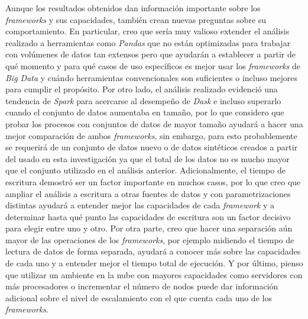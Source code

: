 Aunque los resultados obtenidos dan información importante sobre los \textit{frameworks} y sus capacidades, también crean nuevas preguntas sobre su comportamiento. En particular, creo que sería muy valioso extender el análisis realizado a herramientas como \textit{Pandas} que no están optimizadas para trabajar con volúmenes de datos tan extensos pero que ayudarán a establecer a partir de qué momento y para qué casos de uso específicos es mejor usar los \textit{frameworks} de \textit{Big Data} y cuándo herramientas convencionales son suficientes o incluso mejores para cumplir el propósito. Por otro lado, el análisis realizado evidenció una tendencia de \textit{Spark} para acercarse al desempeño de \textit{Dask} e incluso superarlo cuando el conjunto de datos aumentaba en tamaño, por lo que considero que probar los procesos con conjuntos de datos de mayor tamaño ayudará a hacer una mejor comparación de ambos \textit{frameworks}, sin embargo, para esto probablemente se requerirá de un conjunto de datos nuevo o de datos sintéticos creados a partir del usado en esta investigación ya que el total de los datos no es mucho mayor que el conjunto utilizado en el análisis anterior. Adicionalmente, el tiempo de escritura demostró ser un factor importante en muchos casos, por lo que creo que ampliar el análisis a escritura a otras fuentes de datos y con parametrizaciones distintas ayudará a entender mejor las capacidades de cada \textit{framework} y a determinar hasta qué punto las capacidades de escritura son un factor decisivo para elegir entre uno y otro. Por otra parte, creo que hacer una separación aún mayor de las operaciones de los \textit{frameworks}, por ejemplo midiendo el tiempo de lectura de datos de forma separada, ayudará a conocer más sobre las capacidades de cada uno y a entender mejor el tiempo total de ejecución. Y por último, pienso que utilizar un ambiente en la nube con mayores capacidades como servidores con más procesadores o incrementar el número de nodos puede dar información adicional sobre el nivel de escalamiento con el que cuenta cada uno de los \textit{frameworks}.
